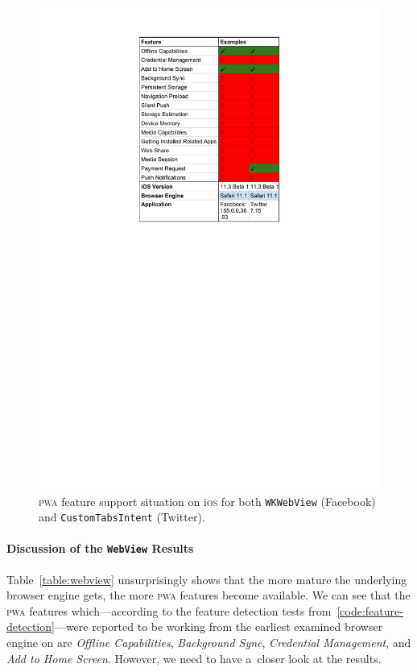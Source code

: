 \documentclass[sigconf]{acmart}
\begin{document}
\begin{figure}[t]
  \renewcommand{\figurename}{Table}
  \begin{center}
  \centerline{\includegraphics[width=.65\columnwidth,trim=4.3cm 16.4cm 4.3cm 1.5cm, clip]{ios-results.pdf}}
  \caption{\textsc{pwa} feature support situation on i\textsc{os} for both \texttt{WKWebView} (Facebook)
    and \texttt{CustomTabsIntent} (Twitter).}
  \label{table:safari}
  \end{center}
\end{figure}

\paragraph{Discussion of the \texttt{WebView} Results}

Table~\ref{table:webview} unsurprisingly shows that the more mature
the underlying browser engine gets, the more \textsc{pwa} features become available.
We can see that the \textsc{pwa} features which---according to the feature detection tests
from~\autoref{code:feature-detection}---were reported to be working
from the earliest examined browser engine on are \emph{Offline Capabilities},
\emph{Background Sync}, \emph{Credential Management}, and \emph{Add to Home Screen}.
However, we need to have a~closer look at the results.
\end{document}
